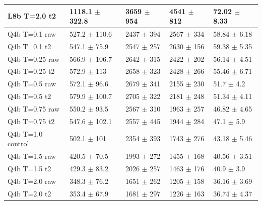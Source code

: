\begin{tabular}{lllll}
 L8b T=2.0 t2         & 1118.1 {\small $\pm$ 322.8} & 3659 {\small $\pm$ 954}  & 4541 {\small $\pm$ 812}   & 72.02 {\small $\pm$ 8.33}  \\
 \midrule
 Q4b T=0.1 raw        & 527.2 {\small $\pm$ 110.6}  & 2437 {\small $\pm$ 394}  & 2567 {\small $\pm$ 334}   & 58.84 {\small $\pm$ 6.18}  \\
 Q4b T=0.1 t2         & 547.1 {\small $\pm$ 75.9}   & 2547 {\small $\pm$ 257}  & 2630 {\small $\pm$ 156}   & 59.38 {\small $\pm$ 5.35}  \\
 \midrule
 Q4b T=0.25 raw       & 566.9 {\small $\pm$ 106.7}  & 2642 {\small $\pm$ 315}  & 2422 {\small $\pm$ 202}   & 56.14 {\small $\pm$ 4.51}  \\
 Q4b T=0.25 t2        & 572.9 {\small $\pm$ 113}    & 2658 {\small $\pm$ 323}  & 2428 {\small $\pm$ 266}   & 55.46 {\small $\pm$ 6.71}  \\
 \midrule
 Q4b T=0.5 raw        & 572.1 {\small $\pm$ 96.6}   & 2679 {\small $\pm$ 341}  & 2155 {\small $\pm$ 230}   & 51.7 {\small $\pm$ 4.2}    \\
 Q4b T=0.5 t2         & 579.9 {\small $\pm$ 100.7}  & 2705 {\small $\pm$ 322}  & 2181 {\small $\pm$ 248}   & 51.34 {\small $\pm$ 4.11}  \\
 \midrule
 Q4b T=0.75 raw       & 550.2 {\small $\pm$ 93.5}   & 2567 {\small $\pm$ 310}  & 1963 {\small $\pm$ 257}   & 46.82 {\small $\pm$ 4.65}  \\
 Q4b T=0.75 t2        & 547.6 {\small $\pm$ 102.1}  & 2557 {\small $\pm$ 445}  & 1944 {\small $\pm$ 284}   & 47.1 {\small $\pm$ 5.9}    \\
 \midrule
 Q4b T=1.0 control    & 502.1 {\small $\pm$ 101}    & 2354 {\small $\pm$ 393}  & 1743 {\small $\pm$ 276}   & 43.18 {\small $\pm$ 5.46}  \\
 \midrule
 Q4b T=1.5 raw        & 420.5 {\small $\pm$ 70.5}   & 1993 {\small $\pm$ 272}  & 1455 {\small $\pm$ 168}   & 40.56 {\small $\pm$ 3.51}  \\
 Q4b T=1.5 t2         & 429.3 {\small $\pm$ 83.2}   & 2026 {\small $\pm$ 257}  & 1463 {\small $\pm$ 176}   & 40.9 {\small $\pm$ 3.9}    \\
 \midrule
 Q4b T=2.0 raw        & 348.3 {\small $\pm$ 76.2}   & 1651 {\small $\pm$ 262}  & 1205 {\small $\pm$ 158}   & 36.16 {\small $\pm$ 3.69}  \\
 Q4b T=2.0 t2         & 353.4 {\small $\pm$ 67.9}   & 1681 {\small $\pm$ 297}  & 1226 {\small $\pm$ 163}   & 36.74 {\small $\pm$ 4.37}  \\
\bottomrule
\end{tabular}
